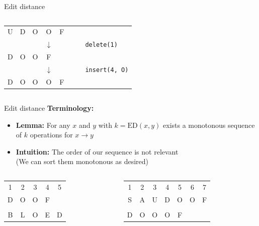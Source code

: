 \begin{frame}{Edit distance}
\begin{columns}
\begin{column}{0.5\linewidth}
\begin{center}
\begin{tabular}{c@{}c@{}c@{}c@{}c@{}c@{}cl}
          U & D & O & O & F\\
          {} & {} & {} & $\downarrow$ & {} & {} & {} &
          \texttt{delete({\color{Mittel-Blau}1})}\\
          D & O & O & F\\
          {} & {} & {} & $\downarrow$ & {} & {} & {} &
          \texttt{insert({\color{Mittel-Blau}4}, O)}\\
          D & O & O & O & F
        \end{tabular}
      \end{center}
    \end{column}
  \end{columns}
\end{frame}


\begin{frame}{Edit distance}
  \textbf{Terminology:}
  \begin{itemize}
    \item<2->
      \textbf{Lemma:}
      For any {\color{Mittel-Blau}$x$} and {\color{Mittel-Blau}$y$}
      with $k = \mathrm{ED}(x, y)$ exists a {\color{Mittel-Blau}monotonous}
      sequence of $k$ operations for {\color{Mittel-Blau}$x \rightarrow y$}
    \item<3->
      \textbf{Intuition:}
      The order of our sequence is not relevant\\
      (We can sort them monotonous as desired)
  \end{itemize}
  \begin{columns}[T]
    \begin{column}{0.5\linewidth}
      \begin{center}
        \begin{tabular}{ccccc}
          1 & 2 & 3 & 4 & 5\\
          D & O & O & F\\
          \\
          B & L & O & E & D
        \end{tabular}
      \end{center}
    \end{column}
    \begin{column}{0.5\linewidth}
      \begin{center}
        \begin{tabular}{ccccccc}
          1 & 2 & 3 & 4 & 5 & 6 & 7\\
          S & A & U & D & O & O & F\\
          \\
          D & O & O & O & F
        \end{tabular}
      \end{center}
    \end{column}
  \end{columns}
\end{frame}


